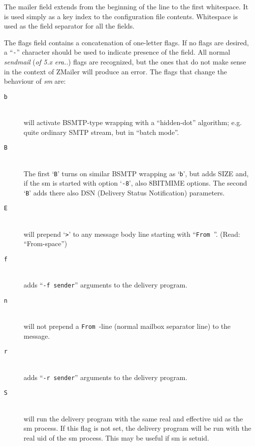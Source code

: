 The mailer field extends from the beginning of the line to
the first whitespace.  It is used simply as a key index to
the configuration  file  contents.  Whitespace is used as
the field separator for all the fields.

The flags field contains  a  concatenation  of  one-letter
flags.  If no flags are desired, a ``{\tt -}'' character should be
used to indicate presence of the field.
All normal {\em sendmail} ({\em of 5.x era..}) flags are recognized, but the ones that
do not make sense in the context of ZMailer will produce an error.
The flags that change the behaviour of {\em sm} are:

\begin{description}
\item[ {\tt b}] \mbox{} \\
will activate BSMTP-type wrapping with a ``hidden-dot''
algorithm; e.g. quite ordinary SMTP stream, but in ``batch mode''.

\item[ {\tt B}] \mbox{} \\
The  first `{\tt B}'  turns on similar BSMTP wrapping as
`{\tt b}', but adds SIZE and, if the sm is  started  with
option `{\tt -8}', also 8BITMIME options.  The second `{\tt B}'
adds there also DSN (Delivery Status  Notification) parameters.

\item[ {\tt E}] \mbox{} \\
will prepend `\verb/>/' to any message body line starting
with ``\verb*/From /''. (Read: ``From-space'')

\item[ {\tt f}] \mbox{} \\
adds ``{\tt -f sender}'' arguments to the delivery program.

\item[ {\tt n}] \mbox{} \\
will not prepend a \verb*/From /-line (normal mailbox
separator line) to the message.

\item[ {\tt r}] \mbox{} \\
adds ``{\tt -r sender}'' arguments to the delivery program.

\item[ {\tt S}] \mbox{} \\
will run the delivery program with the same real
and effective uid as the sm process.  If this  flag
is  not  set, the delivery program will be run with
the real uid of the sm process. This may be useful if sm is setuid.


\end{description}
